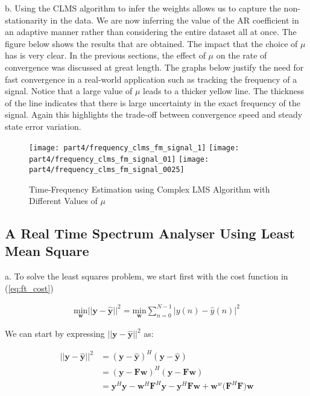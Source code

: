 \noindent{}b. Using the CLMS algorithm to infer the weights allows us to capture the non-stationarity in the data. We are now inferring the value of the AR coefficient in an adaptive manner rather than considering the entire dataset all at once. The figure below shows the results that are obtained. The impact that the choice of $\mu$ has is very clear. In the previous sections, the effect of $\mu$ on the rate of convergence was discussed at great length. The graphs below justify the need for fast convergence in a real-world application such as tracking the frequency of a signal. Notice that a large value of $\mu$ leads to a thicker yellow line. The thickness of the line indicates that there is large uncertainty in the exact frequency of the signal. Again this highlights the trade-off between convergence speed and steady state error variation.

\begin{figure}[H]
\centering{}
\texttt{[image: part4/frequency\_clms\_fm\_signal\_1]}
\texttt{[image: part4/frequency\_clms\_fm\_signal\_01]}
\texttt{[image: part4/frequency\_clms\_fm\_signal\_0025]}
\caption{Time-Frequency Estimation using Complex LMS Algorithm with Different Values of $\mu$}
\end{figure}

\subsection{A Real Time Spectrum Analyser Using Least Mean Square}

\noindent{}a. To solve the least squares problem, we start first with the cost function in (\ref{eq:ft_cost})

\begin{align}
\underset{\textbf{w}}{\text{min}} ||\textbf{y}-\hat{\textbf{y}}||^2 =  \underset{\textbf{w}}{\text{min}} \sum_{n=0}^{N-1}|y(n)-\hat{y}(n)|^2\label{eq:ft_cost}
\end{align}

\noindent{}We can start by expressing $||\textbf{y}-\hat{\textbf{y}}||^2$ as:

\begin{align*}
||\textbf{y}-\hat{\textbf{y}}||^2 &= (\textbf{y}-\hat{\textbf{y}})^H(\textbf{y}-\hat{\textbf{y}}) \\
&= (\textbf{y}-\textbf{F}\textbf{w})^H(\textbf{y}-\textbf{F}\textbf{w}) \\
&= \textbf{y}^H\textbf{y} - \textbf{w}^H\textbf{F}^H\textbf{y} - \textbf{y}^H\textbf{F}\textbf{w} + \textbf{w}^w\big(\textbf{F}^H\textbf{F}\big)\textbf{w}
\end{align*}

